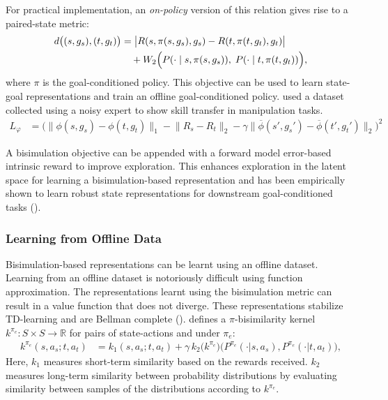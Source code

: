 \documentclass{article}
\begin{document}
For practical implementation, an \emph{on-policy} version of this relation gives rise to a paired-state metric:
\begin{align}
    d\big((s,g_s), (t,g_t)\big) 
    &= \big| R(s, \pi(s,g_s), g_s) - R(t, \pi(t,g_t), g_t) \big| \notag \\
    &\quad + W_2 \Big( P(\cdot \mid s, \pi(s,g_s)), \;
    P(\cdot \mid t, \pi(t,g_t)) \Big), \label{eq:metric}
\end{align}
where $\pi$ is the goal-conditioned policy. This objective can be used to learn state-goal representations and train an offline goal-conditioned policy. \cite{hansen2022bisimulation} used a dataset collected using a noisy expert to show skill transfer in manipulation tasks. 
\begin{align}
L_{\varphi} &= \biggl( \bigl\|
    \phi(s, g_s) - \phi(t, g_t)
\bigr\|_1
- \bigl\| R_s - R_t \bigr\|_2
- \gamma \bigl\|
    \overline{\phi}(s', g_s') - \overline{\phi}(t', g_t')
\bigr\|_2
\biggr)^2
\end{align}

A bisimulation objective can be appended with a forward model error-based intrinsic reward to improve exploration. This enhances exploration in the latent space for learning a bisimulation-based representation and has been empirically shown to learn robust state representations for downstream goal-conditioned tasks (\cite{kemertas2021towards}). 


\subsubsection{Learning from Offline Data}
Bisimulation-based representations can be learnt using an offline dataset. Learning from an offline dataset is notoriously difficult using function approximation. The representations learnt using the bisimulation metric can result in a value function that does not diverge. These representations stabilize TD-learning and are Bellman complete (\cite{pavse2024stable}). \cite{pavse2024stable} defines a $\pi$-bisimilarity kernel $k^{\pi_e} : S \times S \to \mathbb{R}$ for pairs of state-actions and under $\pi_e$:
\begin{align}
k^{\pi_e}(s,a_s; t,a_t) 
&= k_1(s,a_s; t,a_t) 
   + \gamma \, k_2\big(k^{\pi_e}\big)\big(P^{\pi_e}(\cdot|s,a_s), P^{\pi_e}(\cdot|t,a_t)\big),
\end{align}
Here, $k_1$ measures short-term similarity based on the rewards received. $k_2$ measures long-term similarity between probability distributions by evaluating similarity between samples of the distributions according to $k^{\pi_e}$.
\end{document}
